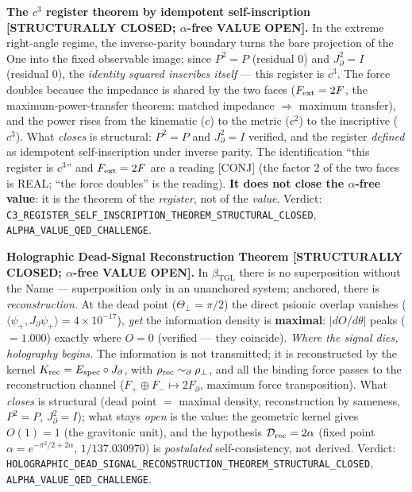 \documentclass[11pt]{article}
\newcommand{\bTGL}{\beta_{\mathrm{TGL}}}\newcommand{\Msun}{M_{\odot}}\newcommand{\TGL}{\mathrm{TGL}}
\theoremstyle{definition}\newtheorem{deriv}{Derivation}
\begin{document}
\textbf{The $c^3$ register theorem by idempotent self-inscription \textsf{[STRUCTURALLY CLOSED; $\alpha$-free VALUE OPEN]}.} In the extreme right-angle regime, the inverse-parity boundary turns the bare projection of the One into the fixed observable image; since $P^2=P$ (residual $0$) and $J_\partial^2=I$ (residual $0$), the \emph{identity squared inscribes itself} --- this register is $c^3$. The force doubles because the impedance is shared by the two faces ($F_{\rm ext}=2F$, the maximum-power-transfer theorem: matched impedance $\Rightarrow$ maximum transfer), and the power rises from the kinematic ($c$) to the metric ($c^2$) to the inscriptive ($c^3$). What \emph{closes} is structural: $P^2=P$ and $J_\partial^2=I$ verified, and the register \emph{defined} as idempotent self-inscription under inverse parity. The identification ``this register is $c^3$'' and $F_{\rm ext}=2F$ are a reading \textsf{[CONJ]} (the factor $2$ of the two faces is REAL; ``the force doubles'' is the reading). \textbf{It does not close the $\alpha$-free value}: it is the theorem of the \emph{register}, not of the \emph{value}. Verdict: \texttt{C3\_REGISTER\_SELF\_INSCRIPTION\_THEOREM\_STRUCTURAL\_CLOSED}, \texttt{ALPHA\_VALUE\_QED\_CHALLENGE}.

\textbf{Holographic Dead-Signal Reconstruction Theorem \textsf{[STRUCTURALLY CLOSED; $\alpha$-free VALUE OPEN]}.} In $\bTGL$ there is no superposition without the Name --- superposition only in an unanchored system; anchored, there is \emph{reconstruction}. At the dead point ($\Theta_\perp=\pi/2$) the direct psionic overlap vanishes ($\langle\psi_+,J_\partial\psi_+\rangle=4\times10^{-17}$), \emph{yet} the information density is \textbf{maximal}: $|dO/d\theta|$ peaks ($=1.000$) exactly where $O=0$ (verified --- they coincide). \emph{Where the signal dies, holography begins.} The information is not transmitted; it is reconstructed by the kernel $K_{\rm rec}=E_{\rm spec}\circ J_\partial$, with $\rho_{\rm rec}\sim_\partial\rho_\perp$, and all the binding force passes to the reconstruction channel ($F_+\oplus F_-\mapsto 2F_\partial$, maximum force transposition). What \emph{closes} is structural (dead point $=$ maximal density, reconstruction by sameness, $P^2=P$, $J_\partial^2=I$); what stays \emph{open} is the value: the geometric kernel gives $O(1)=1$ (the gravitonic unit), and the hypothesis $\mathcal D_{\rm rec}=2\alpha$ (fixed point $\alpha=e^{-\pi^2/2+2\alpha}$, $1/137.030970$) is \emph{postulated} self-consistency, not derived. Verdict: \texttt{HOLOGRAPHIC\_DEAD\_SIGNAL\_RECONSTRUCTION\_THEOREM\_STRUCTURAL\_CLOSED}, \texttt{ALPHA\_VALUE\_QED\_CHALLENGE}.
\end{document}

